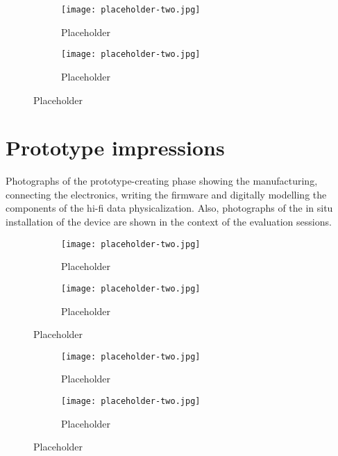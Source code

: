 \begin{appendices}
\begin{figure}[htbp]
    \centering
    \begin{subfigure}{0.48\textwidth}
        \centering
        \texttt{[image: placeholder-two.jpg]}
        \caption{Placeholder}
        \label{fig:image1}
    \end{subfigure}
    \hfill
    \begin{subfigure}{0.48\textwidth}
        \centering
        \texttt{[image: placeholder-two.jpg]}
        \caption{Placeholder}
        \label{fig:image2}
    \end{subfigure}
    \caption{Placeholder}
    \label{fig:grid}
\end{figure}

\section{Prototype impressions}
\label{appendix:prototype}

Photographs of the prototype-creating phase showing the manufacturing, connecting the electronics, writing the firmware and digitally modelling the components of the hi-fi data physicalization. Also, photographs of the in situ installation of the device are shown in the context of the evaluation sessions.

\begin{figure}[htbp]
    \centering
    \begin{subfigure}{0.48\textwidth}
        \centering
        \texttt{[image: placeholder-two.jpg]}
        \caption{Placeholder}
        \label{fig:image1}
    \end{subfigure}
    \hfill
    \begin{subfigure}{0.48\textwidth}
        \centering
        \texttt{[image: placeholder-two.jpg]}
        \caption{Placeholder}
        \label{fig:image2}
    \end{subfigure}
    \caption{Placeholder}
    \label{fig:grid}
\end{figure}

\begin{figure}[htbp]
    \centering
    \begin{subfigure}{0.48\textwidth}
        \centering
        \texttt{[image: placeholder-two.jpg]}
        \caption{Placeholder}
        \label{fig:image1}
    \end{subfigure}
    \hfill
    \begin{subfigure}{0.48\textwidth}
        \centering
        \texttt{[image: placeholder-two.jpg]}
        \caption{Placeholder}
        \label{fig:image2}
    \end{subfigure}
    \caption{Placeholder}
    \label{fig:grid}
\end{figure}


\end{appendices}
